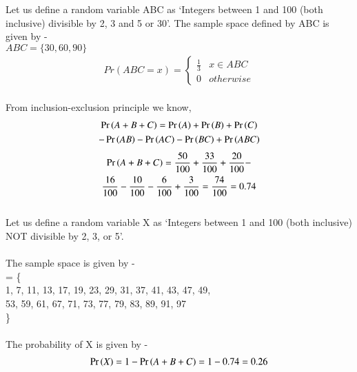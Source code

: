 \documentclass[journal,12pt,twocolumn]{IEEEtran}
\begin{document}
Let us define a random variable ABC as `Integers between 1 and 100 (both inclusive) divisible by 2, 3 and 5 or 30'. The sample space defined by ABC is given by - \\
$ABC = \{ 30, 60, 90\}$\\
\begin{align}
    Pr(ABC=x) =
    \begin{cases}
        \frac{1}{3} & x \in ABC \\
        0 & otherwise
    \end{cases}
\end{align}
\\
From inclusion-exclusion principle we know, \\
\begin{multline}
    \Pr\left(A + B + C\right) = \Pr\left(A\right) + \Pr\left(B\right) + \Pr\left(C\right)\\ - \Pr\left(AB\right) - \Pr\left(AC\right) - \Pr\left(BC\right) + \Pr\left(ABC\right)\\
\end{multline}
\begin{multline}
    \Pr\left(A + B + C\right) = \dfrac{50}{100} + \dfrac{33}{100} + \dfrac{20}{100} -\\ \dfrac{16}{100} - \dfrac{10}{100} - \dfrac{6}{100} + \dfrac{3}{100} = \dfrac{74}{100} = 0.74\\
\end{multline}
\\
Let us define a random variable X as `Integers between 1 and 100 (both inclusive) NOT divisible by 2, 3, or 5'.\\
\\
The sample space is given by -\\
= \{\\
1, 7, 11, 13, 17, 19, 23, 29, 31, 37, 41, 43, 47, 49,\\
53, 59, 61, 67, 71, 73, 77, 79, 83, 89, 91, 97\\
\}\\
\\
The probability of X is given by - \\
\begin{multline}
    \Pr\left(X\right) = 1 - \Pr\left(A + B + C\right) = 1 - 0.74 = 0.26\\
\end{multline}
\end{document}
